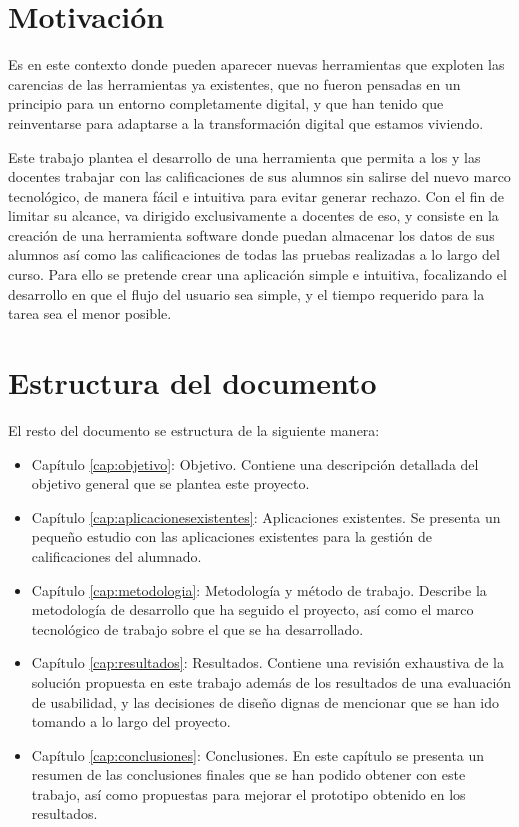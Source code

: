 \section{Motivación}

Es en este contexto donde pueden aparecer nuevas herramientas que exploten las carencias de las herramientas ya existentes, que no fueron pensadas en un principio para un entorno completamente digital, y que han tenido que reinventarse para adaptarse a la transformación digital que estamos viviendo. 

Este trabajo plantea el desarrollo de una herramienta que permita a los y las docentes trabajar con las calificaciones de sus alumnos sin salirse del nuevo marco tecnológico, de manera fácil e intuitiva para evitar generar rechazo. Con el fin de limitar su alcance, va dirigido exclusivamente a docentes de \gls{eso}, y consiste en la creación de una herramienta software donde puedan almacenar los datos de sus alumnos así como las calificaciones de todas las pruebas realizadas a lo largo del curso. Para ello se pretende crear una aplicación simple e intuitiva, focalizando el desarrollo en que el flujo del usuario sea simple, y el tiempo requerido para la tarea sea el menor posible.



\section{Estructura del documento}
El resto del documento se estructura de la siguiente manera:

\begin{itemize}
    \item Capítulo \ref{cap:objetivo}: Objetivo. Contiene una descripción detallada del objetivo general que se plantea este proyecto.
    \item Capítulo \ref{cap:aplicacionesexistentes}: Aplicaciones existentes. Se presenta un pequeño estudio con las aplicaciones existentes para la gestión de calificaciones del alumnado.
    \item Capítulo \ref{cap:metodologia}: Metodología y método de trabajo. Describe la metodología de desarrollo que ha seguido el proyecto, así como el marco tecnológico de trabajo sobre el que se ha desarrollado.
    \item Capítulo \ref{cap:resultados}: Resultados. Contiene una revisión exhaustiva de la solución propuesta en este trabajo además de los resultados de una evaluación de usabilidad, y las decisiones de diseño dignas de mencionar que se han ido tomando a lo largo del proyecto.
    \item Capítulo \ref{cap:conclusiones}: Conclusiones. En este capítulo se presenta un resumen de las conclusiones finales que se han podido obtener con este trabajo, así como propuestas para mejorar el prototipo obtenido en los resultados.
\end{itemize}
